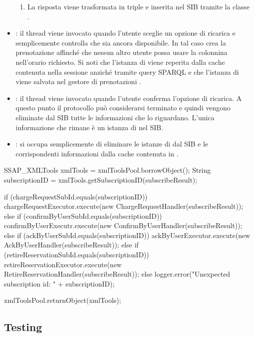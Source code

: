 \begin{itemize}
\begin{enumerate}
		\item La risposta viene trasformata in triple e inserita nel SIB tramite la classe .
	\end{enumerate}
	\item {}: il thread viene invocato quando l'utente sceglie un opzione di ricarica e semplicemente controlla che sia ancora disponibile. In tal caso crea la prenotazione affinché che nessun altro utente possa usare la colonnina nell'orario richiesto. Si noti che l'istanza di  viene reperita dalla cache contenuta nella sessione anziché tramite query SPARQL e che l'istanza di  viene salvata nel gestore di prenotazioni .
	\item {}: il thread viene invocato quando l'utente conferma l'opzione di ricarica. A questo punto il protocollo può considerarsi terminato e quindi vengono eliminate dal SIB tutte le informazioni che lo riguardano. L'unica informazione che rimane è un istanza di  nel SIB.
	\item {}: si occupa semplicemente di eliminare le istanze di  dal SIB e le corrispondenti informazioni dalla cache contenuta in .
\end{itemize}

\begin{java}[caption={Corpo di RequestDispatcher},label={lst:requestDispatcher}]
SSAP_XMLTools xmlTools = xmlToolsPool.borrowObject();
String subscriptionID = xmlTools.getSubscriptionID(subscribeResult);

if (chargeRequestSubId.equals(subscriptionID)) {
	chargeRequestExecutor.execute(new ChargeRequestHandler(subscribeResult));
} else if (confirmByUserSubId.equals(subscriptionID)) {
	confirmByUserExecutr.execute(new ConfirmByUserHandler(subscribeResult));
} else if (ackByUserSubId.equals(subscriptionID)) {
	ackByUserExecutor.execute(new AckByUserHandler(subscribeResult));
} else if (retireReservationSubId.equals(subscriptionID)) {
	retireReservationExecutor.execute(new RetireReservationHandler(subscribeResult));
} else {
	logger.error("Unexpected subscription id: " + subscriptionID);
}

xmlToolsPool.returnObject(xmlTools);
\end{java}	


\subsection{Testing}


